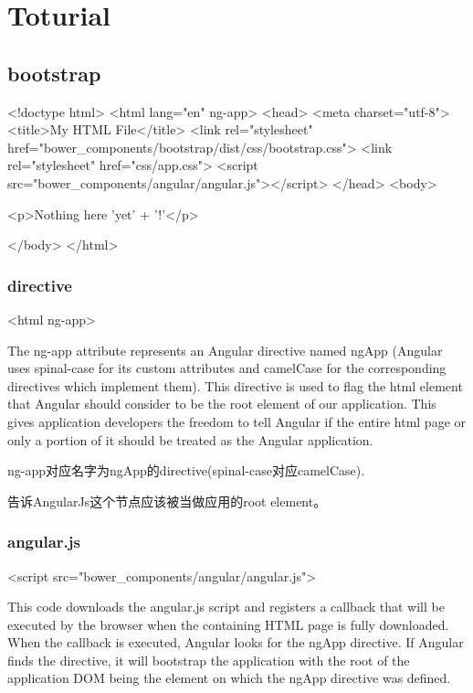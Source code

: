 \section{Toturial}

\subsection{bootstrap}

\begin{HTML5}
<!doctype html>
<html lang="en" ng-app>
<head>
  <meta charset="utf-8">
  <title>My HTML File</title>
  <link rel="stylesheet" href="bower_components/bootstrap/dist/css/bootstrap.css">
  <link rel="stylesheet" href="css/app.css">
  <script src="bower_components/angular/angular.js"></script>
</head>
<body>

  <p>Nothing here {{'yet' + '!'}}</p>

</body>
</html>
\end{HTML5}


\subsubsection{directive}

\begin{HTML5}[ng-app]
<html ng-app>
\end{HTML5}

The ng-app attribute represents an Angular directive named ngApp (Angular uses spinal-case for its custom attributes and camelCase for the corresponding directives which implement them). This directive is used to flag the html element that Angular should consider to be the root element of our application. This gives application developers the freedom to tell Angular if the entire html page or only a portion of it should be treated as the Angular application.


ng-app对应名字为ngApp的directive(spinal-case对应camelCase).

告诉AngularJs这个节点应该被当做应用的root element。

\subsubsection{angular.js}

\begin{HTML5}[ng-app]
<script src="bower_components/angular/angular.js">
\end{HTML5}

This code downloads the angular.js script and registers a callback that will be executed by the browser when the containing HTML page is fully downloaded. When the callback is executed, Angular looks for the ngApp directive. If Angular finds the directive, it will bootstrap the application with the root of the application DOM being the element on which the ngApp directive was defined.



